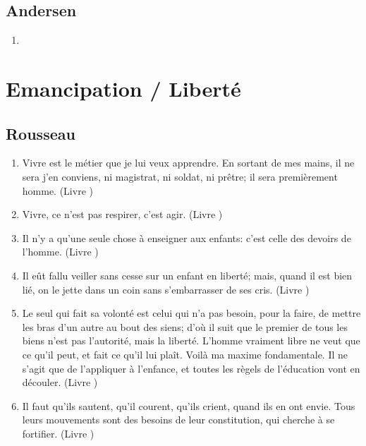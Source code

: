 \documentclass[a4paper, 11pt, hidelinks]{article}
\newcommand{\rb}[1]{\Romanbar{#1}}
\begin{document}
\subsection{Andersen}


\begin{enumerate}
    \item 
\end{enumerate}


































\section{Emancipation / Liberté}



\subsection{Rousseau}


\begin{enumerate}
    \item Vivre est le métier que je lui veux apprendre. En sortant de mes mains, il ne sera j'en conviens, ni magistrat, ni soldat, ni prêtre; il sera premièrement homme. (Livre \rb{1})
    \item Vivre, ce n'est pas respirer, c'est agir. (Livre \rb{1})
    \item Il n'y a qu'une seule chose à enseigner aux enfants: c'est celle des devoirs de l'homme. (Livre \rb{1})
    \item Il eût fallu veiller sans cesse sur un enfant en liberté; mais, quand il est bien lié, on le jette dans un coin sans s'embarrasser de ses cris. (Livre \rb{69})
    \item Le seul qui fait sa volonté est celui qui n'a pas besoin, pour la faire, de mettre les bras d'un autre au bout des siens; d'où il suit que le premier de tous les biens n'est pas l'autorité, mais la liberté. L'homme vraiment libre ne veut que ce qu'il peut, et fait ce qu'il lui plaît. Voilà ma maxime fondamentale. Il ne s'agit que de l'appliquer à l'enfance, et toutes les règels de l'éducation vont en découler. (Livre \rb{2})  
    \item Il faut qu'ils sautent, qu'il courent, qu'ils crient, quand ils en ont envie. Tous leurs mouvements sont des besoins de leur constitution, qui cherche à se fortifier. (Livre \rb{2})
\end{enumerate}
\end{document}
